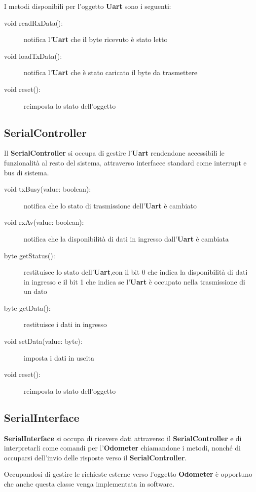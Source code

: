 \documentclass [11pt,a4paper,oneside]{paper}
\newcommand{\component}[1]{\textbf{#1}}
\begin{document}
I metodi disponibili per l'oggetto \component{Uart} sono i seguenti:

\begin{description}
\item[void readRxData():] notifica l'\component{Uart} che il byte ricevuto è
    stato letto
\item[void loadTxData():] notifica l'\component{Uart} che è stato caricato il
    byte da trasmettere
\item[void reset():] reimposta lo stato dell'oggetto
\end{description}

\subsection{SerialController}
Il \component{SerialController} si occupa di gestire l'\component{Uart}
rendendone accessibili le funzionalità al resto del sistema,
attraverso interfacce standard come interrupt e bus di sistema.

\begin{description}
\item[void txBusy(value: boolean):] notifica che lo stato di trasmissione
    dell'\component{Uart} è cambiato
\item[void rxAv(value: boolean):] notifica che la disponibilità di dati
    in ingresso dall'\component{Uart} è cambiata
\item[byte getStatus():] restituisce lo stato dell'\component{Uart},con il
    bit 0 che indica la disponibilità di dati in ingresso e il bit 1 che
    indica se l'\component{Uart} è occupato nella trasmissione di un dato
\item[byte getData():] restituisce i dati in ingresso
\item[void setData(value: byte):] imposta i dati in uscita
\item[void reset():] reimposta lo stato dell'oggetto
\end{description}

\subsection{SerialInterface}
\component{SerialInterface} si occupa di ricevere dati attraverso il
\component{SerialController} e di interpretarli come comandi per
l'\component{Odometer} chiamandone i metodi, nonché di occuparsi
dell'invio delle risposte verso il \component{SerialController}.

Occupandosi di gestire le richieste esterne verso l'oggetto
\component{Odometer} è opportuno che anche questa classe venga
implementata in software.
\end{document}
